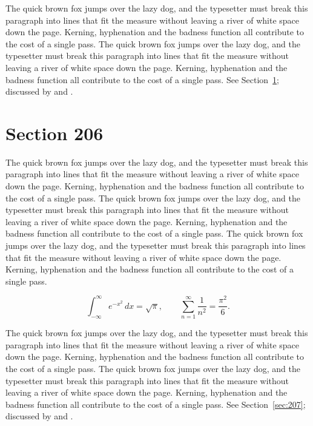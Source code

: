 \documentclass{article}
\begin{document}
The quick brown fox jumps over the lazy dog, and the typesetter must break this paragraph into lines that fit the measure without leaving a river of white space down the page. Kerning, hyphenation and the badness function all contribute to the cost of a single pass. The quick brown fox jumps over the lazy dog, and the typesetter must break this paragraph into lines that fit the measure without leaving a river of white space down the page. Kerning, hyphenation and the badness function all contribute to the cost of a single pass. 
See Section~\ref{sec:206}; discussed by \textcite{k1} and \textcite{l3}.
\section{Section 206}
\label{sec:206}
The quick brown fox jumps over the lazy dog, and the typesetter must break this paragraph into lines that fit the measure without leaving a river of white space down the page. Kerning, hyphenation and the badness function all contribute to the cost of a single pass. The quick brown fox jumps over the lazy dog, and the typesetter must break this paragraph into lines that fit the measure without leaving a river of white space down the page. Kerning, hyphenation and the badness function all contribute to the cost of a single pass. The quick brown fox jumps over the lazy dog, and the typesetter must break this paragraph into lines that fit the measure without leaving a river of white space down the page. Kerning, hyphenation and the badness function all contribute to the cost of a single pass. 

\begin{equation}\label{eq:206}
\int_{-\infty}^{\infty} e^{-x^{2}}\,dx = \sqrt{\pi}, \qquad
\sum_{n=1}^{\infty} \frac{1}{n^{2}} = \frac{\pi^{2}}{6}.
\end{equation}

The quick brown fox jumps over the lazy dog, and the typesetter must break this paragraph into lines that fit the measure without leaving a river of white space down the page. Kerning, hyphenation and the badness function all contribute to the cost of a single pass. The quick brown fox jumps over the lazy dog, and the typesetter must break this paragraph into lines that fit the measure without leaving a river of white space down the page. Kerning, hyphenation and the badness function all contribute to the cost of a single pass. 
See Section~\ref{sec:207}; discussed by \textcite{k2} and \textcite{l4}.
\end{document}
